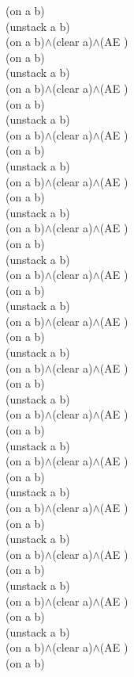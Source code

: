 {{(on a b)\\
(unstack a b)\\
(on a b)$\wedge$(clear a)$\wedge$(AE )\\
(on a b)\\
(unstack a b)\\
(on a b)$\wedge$(clear a)$\wedge$(AE )\\
(on a b)\\
(unstack a b)\\
(on a b)$\wedge$(clear a)$\wedge$(AE )\\
(on a b)\\
(unstack a b)\\
(on a b)$\wedge$(clear a)$\wedge$(AE )\\
(on a b)\\
(unstack a b)\\
(on a b)$\wedge$(clear a)$\wedge$(AE )\\
(on a b)\\
(unstack a b)\\
(on a b)$\wedge$(clear a)$\wedge$(AE )\\
(on a b)\\
(unstack a b)\\
(on a b)$\wedge$(clear a)$\wedge$(AE )\\
(on a b)\\
(unstack a b)\\
(on a b)$\wedge$(clear a)$\wedge$(AE )\\
(on a b)\\
(unstack a b)\\
(on a b)$\wedge$(clear a)$\wedge$(AE )\\
(on a b)\\
(unstack a b)\\
(on a b)$\wedge$(clear a)$\wedge$(AE )\\
(on a b)\\
(unstack a b)\\
(on a b)$\wedge$(clear a)$\wedge$(AE )\\
(on a b)\\
(unstack a b)\\
(on a b)$\wedge$(clear a)$\wedge$(AE )\\
(on a b)\\
(unstack a b)\\
(on a b)$\wedge$(clear a)$\wedge$(AE )\\
(on a b)\\
(unstack a b)\\
(on a b)$\wedge$(clear a)$\wedge$(AE )\\
(on a b)\\
}%
}


